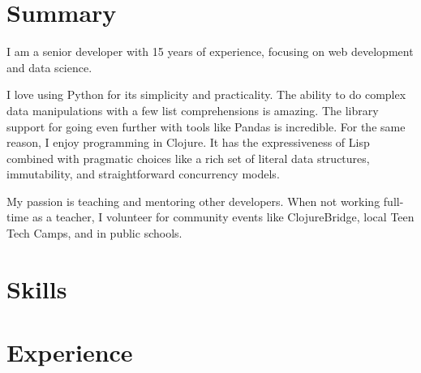 \documentclass[11pt,letterpaper,sans]{moderncv}        %
\begin{document}
	\makecvtitle

	\section{Summary}
	I am a senior developer with 15 years of experience, focusing on web development and data science.
	\par\bigskip
	I love using Python for its simplicity and practicality. The ability to do complex data manipulations with a few list comprehensions is amazing. The library support for going even further with tools like Pandas is incredible. For the same reason, I enjoy programming in Clojure. It has the expressiveness of Lisp combined with pragmatic choices like a rich set of literal data structures, immutability, and straightforward concurrency models.
	\par\bigskip
	My passion is teaching and mentoring other developers. When not working full-time as a teacher, I volunteer for community events like ClojureBridge, local Teen Tech Camps, and in public schools.


	\section{Skills}


	\section{Experience}
	\bigskip
\end{document}
